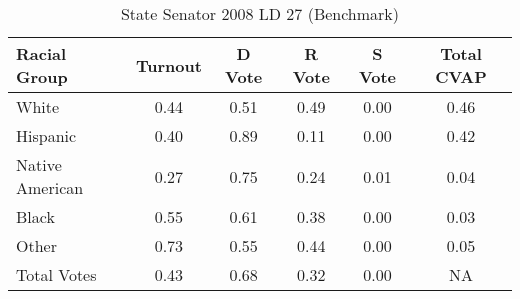 \begin{table}[htb]
\begin{center}
\caption{State Senator 2008 LD 27 (Benchmark)}
\label{stsen08_cvap_ld_27_benchmark}
\begin{tabular}{lccccc}
  \hline
Racial Group & Turnout & D Vote & R Vote & S Vote & Total CVAP \\ 
  \hline
   White & 0.44  & 0.51  & 0.49  & 0.00  & 0.46 \\
    Hispanic & 0.40  & 0.89  & 0.11  & 0.00  & 0.42 \\
    Native American & 0.27  & 0.75  & 0.24  & 0.01  & 0.04 \\
    Black & 0.55  & 0.61  & 0.38  & 0.00  & 0.03 \\
    Other & 0.73  & 0.55  & 0.44  & 0.00  & 0.05 \\
    Total Votes & 0.43  & 0.68  & 0.32  & 0.00  &  NA \\
   \hline
\end{tabular}
\end{center}
\end{table}